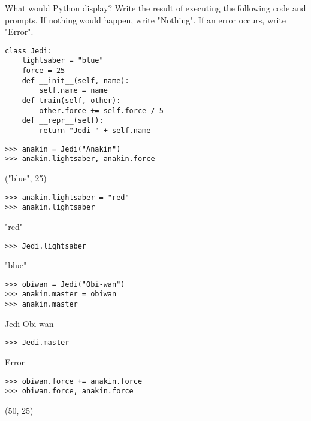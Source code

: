 \begin{blocksection}
\question What would Python display? Write the result of executing the following code and prompts. If nothing would happen, write "Nothing". If an error occurs, write "Error".

\vspace{1.5\baselineskip}

\begin{lstlisting}
class Jedi:
    lightsaber = "blue"
    force = 25
    def __init__(self, name):
        self.name = name
    def train(self, other):
        other.force += self.force / 5
    def __repr__(self):
        return "Jedi " + self.name
\end{lstlisting}
\end{blocksection}

\begin{blocksection}
\begin{lstlisting}
>>> anakin = Jedi("Anakin")
>>> anakin.lightsaber, anakin.force
\end{lstlisting}
\begin{solution}[.2in]
("blue", 25)
\end{solution}

\begin{lstlisting}
>>> anakin.lightsaber = "red"
>>> anakin.lightsaber 
\end{lstlisting}
\begin{solution}[.2in]
"red"
\end{solution}

\begin{lstlisting}
>>> Jedi.lightsaber 
\end{lstlisting}
\begin{solution}[.2in]
"blue"
\end{solution}

\begin{lstlisting}
>>> obiwan = Jedi("Obi-wan")
>>> anakin.master = obiwan
>>> anakin.master
\end{lstlisting}
\begin{solution}[.2in]
Jedi Obi-wan
\end{solution}

\begin{lstlisting}
>>> Jedi.master
\end{lstlisting}
\begin{solution}[.2in]
Error
\end{solution}

\begin{lstlisting}
>>> obiwan.force += anakin.force
>>> obiwan.force, anakin.force
\end{lstlisting}
\begin{solution}[.2in]
(50, 25)
\end{solution}


\end{blocksection}
